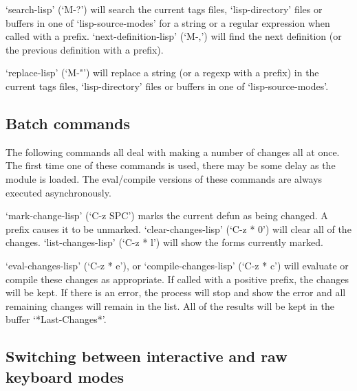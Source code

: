 \shortsubsection{}

`search-lisp' (`M-?') will search the current tags files,
`lisp-directory' files or buffers in one of `lisp-source-modes' for a
string or a regular expression when called with a prefix.
`next-definition-lisp' (`M-,') will find the next definition (or the
previous definition with a prefix).

\shortsubsection{}

`replace-lisp' (`M-"') will replace a string (or a regexp with a
prefix) in the current tags files, `lisp-directory' files or buffers in
one of `lisp-source-modes'.




\subsection{Batch commands}

The following commands all deal with making a number of changes all
at once. The first time one of these commands is used, there may be
some delay as the module is loaded. The eval/compile versions of these
commands are always executed asynchronously.

 `mark-change-lisp' (`C-z SPC') marks the current defun as being
changed.  A prefix causes it to be unmarked.  `clear-changes-lisp'
(`C-z * 0') will clear all of the changes.  `list-changes-lisp' (`C-z *
l') will show the forms currently marked.

`eval-changes-lisp' (`C-z * e'), or `compile-changes-lisp' (`C-z *
c') will evaluate or compile these changes as appropriate.  If called
with a positive prefix, the changes will be kept.  If there is an
error, the process will stop and show the error and all remaining
changes will remain in the list.  All of the results will be kept in
the buffer `*Last-Changes*'.


\subsection{Switching between interactive and raw keyboard modes}

